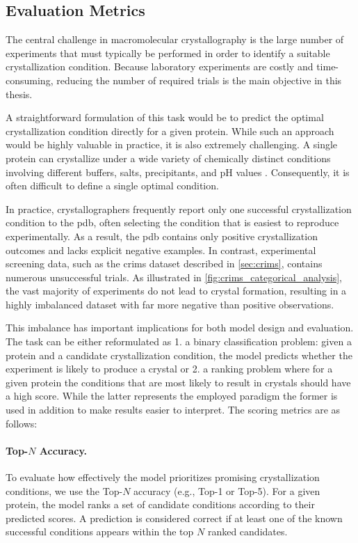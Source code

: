 \subsection{Evaluation Metrics}\label{sec:methods/evaluation_metrics}

The central challenge in macromolecular crystallography is the large number of experiments that must typically be performed in order to identify a suitable crystallization condition. Because laboratory experiments are costly and time-consuming, reducing the number of required trials is the main objective in this thesis.

A straightforward formulation of this task would be to predict the optimal crystallization condition directly for a given protein. While such an approach would be highly valuable in practice, it is also extremely challenging. A single protein can crystallize under a wide variety of chemically distinct conditions involving different buffers, salts, precipitants, and pH values \citep{Liao2025}. Consequently, it is often difficult to define a single optimal condition.

In practice, crystallographers frequently report only one successful crystallization condition to the \gls{pdb}, often selecting the condition that is easiest to reproduce experimentally. As a result, the \gls{pdb} contains only positive crystallization outcomes and lacks explicit negative examples. In contrast, experimental screening data, such as the \gls{crims} dataset described in \autoref{sec:crims}, contains numerous unsuccessful trials. As illustrated in \autoref{fig:crims_categorical_analysis}, the vast majority of experiments do not lead to crystal formation, resulting in a highly imbalanced dataset with far more negative than positive observations.

This imbalance has important implications for both model design and evaluation. The task can be either reformulated as 1. a binary classification problem: given a protein and a candidate crystallization condition, the model predicts whether the experiment is likely to produce a crystal or 2. a ranking problem where for a given protein the conditions that are most likely to result in crystals should have a high score.
While the latter represents the employed paradigm the former is used in addition to make results easier to interpret. The scoring metrics are as follows: 

\paragraph{Top-$N$ Accuracy.}
To evaluate how effectively the model prioritizes promising crystallization conditions, we use the Top-$N$ accuracy (e.g., Top-1 or Top-5). For a given protein, the model ranks a set of candidate conditions according to their predicted scores. A prediction is considered correct if at least one of the known successful conditions appears within the top $N$ ranked candidates.

